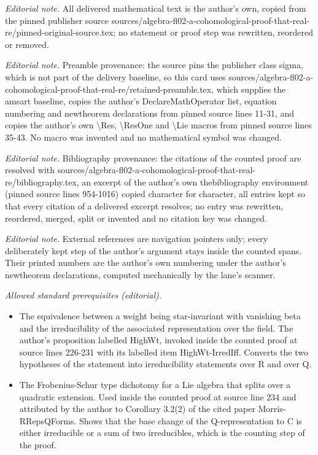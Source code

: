 \maketitle
\noindent\textit{Editorial note.} All delivered mathematical text is the author's own, copied from the pinned publisher source sources/algebra-fl02-a-cohomological-proof-that-real-re/pinned-original-source.tex; no statement or proof step was rewritten, reordered or removed.\par\medskip
\noindent\textit{Editorial note.} Preamble provenance: the source pins the publisher class sigma, which is not part of the delivery baseline, so this card uses sources/algebra-fl02-a-cohomological-proof-that-real-re/retained-preamble.tex, which supplies the amsart baseline, copies the author's DeclareMathOperator list, equation numbering and newtheorem declarations from pinned source lines 11-31, and copies the author's own \textbackslash{}Res, \textbackslash{}ResOne and \textbackslash{}Lie macros from pinned source lines 35-43. No macro was invented and no mathematical symbol was changed.\par\medskip
\noindent\textit{Editorial note.} Bibliography provenance: the citations of the counted proof are resolved with sources/algebra-fl02-a-cohomological-proof-that-real-re/bibliography.tex, an excerpt of the author's own thebibliography environment (pinned source lines 954-1016) copied character for character, all entries kept so that every citation of a delivered excerpt resolves; no entry was rewritten, reordered, merged, split or invented and no citation key was changed.\par\medskip
\noindent\textit{Editorial note.} External references are navigation pointers only; every deliberately kept step of the author's argument stays inside the counted spans. Their printed numbers are the author's own numbering under the author's newtheorem declarations, computed mechanically by the lane's scanner.\par\medskip
\noindent\textit{Allowed standard prerequisites (editorial).}\begin{itemize}
\item The equivalence between a weight being star-invariant with vanishing beta and the irreducibility of the associated representation over the field. The author's proposition labelled HighWt, invoked inside the counted proof at source lines 226-231 with its labelled item HighWt-IrredIff. Converts the two hypotheses of the statement into irreducibility statements over R and over Q.
\item The Frobenius-Schur type dichotomy for a Lie algebra that splits over a quadratic extension. Used inside the counted proof at source line 234 and attributed by the author to Corollary 3.2(2) of the cited paper Morris-RRepsQForms. Shows that the base change of the Q-representation to C is either irreducible or a sum of two irreducibles, which is the counting step of the proof.
\end{itemize}\medskip
